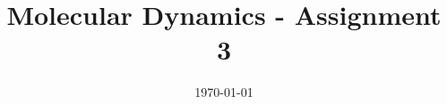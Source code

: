 %
% 
% 
%






\renewcommand{\PersonTitel}{}
\newcommand{\Datum}{\today}

\usepackage{tikz}
\usetikzlibrary{decorations.pathreplacing}
\usetikzlibrary{angles, quotes}
\usetikzlibrary{shapes,arrows, positioning, calc} 
\usepackage{amssymb}

\usepackage{fancyvrb}
\usepackage{tabularx}
\usepackage{blindtext}
\usepackage{listings}

\newlength\myindent
\setlength\myindent{2em}

\renewcommand{\PraesentationFusszeileZusatz}{}%

\title{Molecular Dynamics - Assignment 3}
\author{\PersonVornameAl{} \PersonNachnameHo{} \and
	\PersonVornameJa{} \PersonNachnameHa{} \and
	\PersonVornameJo{} \PersonNachnameRi{} }
\institute[]{\UniversitaetName \\ \FakultaetName \\ \LehrstuhlName}
\date[\Datum]{\today}%
\subject{Thema der Präsentation}



